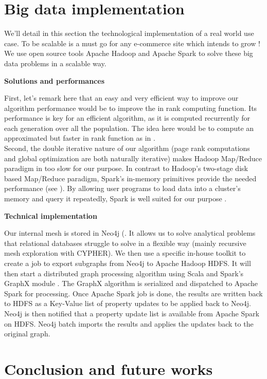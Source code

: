 \documentclass{iSWAGArticle}
\begin{document}
\section{Big data implementation}
We'll detail in this section the technological implementation of a real world use case.
To be scalable is a must go for any e-commerce site which intends to grow !
We use open source tools Apache Hadoop \cite{map_reduce} and Apache Spark \cite{spark_methodo} to solve these big data problems in a scalable way. 
\begin{center}
\textbf{\large Solutions and performances}
\end{center}
First, let's remark here that an easy and very efficient way to improve our algorithm performance would be to improve the in rank computing function. Its performance is key for an efficient algorithm, as it
is computed recurrently for each generation over all the population. The idea here would be to compute an approximated but faster in rank function as in \cite{page_rank_approx}.
\\\newline
Second, the double iterative nature of our algorithm (page rank computations and global optimization are both naturally iterative)
makes Hadoop Map/Reduce paradigm in \cite{map_reduce} too slow for our purpose. 
In contrast to Hadoop's two-stage disk based Map/Reduce paradigm, Spark's in-memory primitives provide the needed performance (see \cite{spark_methodo_bis} \cite{spark_methodo}).
By allowing user programs to load data into a cluster's memory and query it repeatedly, Spark is well suited for our purpose \cite{incremental_ram}
\cite{spark_bis_bis}.
\\\newline
\begin{center}
\textbf{\large Technical implementation}
\end{center}
Our internal mesh is stored in Neo4j (\cite{neo4j}. It allows us to solve analytical problems
 that relational databases struggle to solve in a flexible way (mainly recursive mesh exploration with CYPHER). 
 We then use a specific in-house toolkit to create a job to export subgraphs from Neo4j to Apache Hadoop HDFS.
 It will then start a distributed graph processing algorithm using Scala \cite{scala} and Spark's GraphX module \cite{graphX}. 
 The GraphX algorithm is serialized and dispatched to Apache Spark for processing.
Once Apache Spark job is done, the results are written back to HDFS as a Key-Value list of property updates to be applied back to Neo4j.
Neo4j is then notified that a property update list is available from Apache Spark on HDFS. Neo4j batch imports the results and applies the updates back to the original graph.
\section{Conclusion and future works}
\nocite{*}


\end{document}
